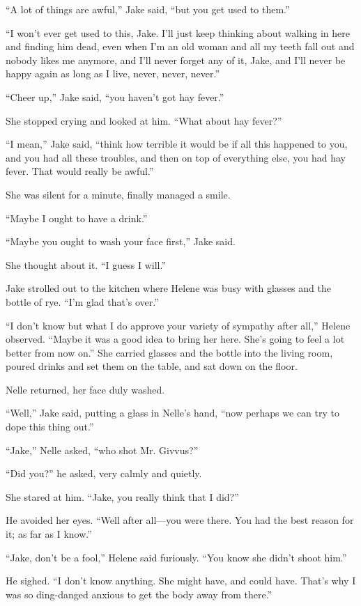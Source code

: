 \documentclass{novel}
\begin{document}
“A lot of things are awful,” Jake said, “but you get used to them.”

“I won’t ever get used to this, Jake. I’ll just keep thinking about walking in here and finding him dead, even when I'm an old woman and all my teeth fall out and nobody likes me anymore, and I’ll never forget any of it, Jake, and I'll never be happy again as long as I live, never, never, never.”

“Cheer up,” Jake said, “you haven’t got hay fever.”

She stopped crying and looked at him. “What about hay fever?”

“I mean,” Jake said, “think how terrible it would be if all this happened to you, and you had all these troubles, and then on top of everything else, you had hay fever. That would really be awful.”

She was silent for a minute, finally managed a smile.

“Maybe I ought to have a drink.”

“Maybe you ought to wash your face first,” Jake said.

She thought about it. “I guess I will.”

Jake strolled out to the kitchen where Helene was busy with glasses and the bottle of rye. “I’m glad that’s over.”

“I don’t know but what I do approve your variety of sympathy after all,” Helene observed. “Maybe it was a good idea to bring her here. She’s going to feel a lot better from now on.” She carried glasses and the bottle into the living room, poured drinks and set them on the table, and sat down on the floor.

Nelle returned, her face duly washed.

“Well,” Jake said, putting a glass in Nelle’s hand, “now perhaps we can try to dope this thing out.”

“Jake,” Nelle asked, “who shot Mr. Givvus?”

“Did you?” he asked, very calmly and quietly.

She stared at him. “Jake, you really think that I did?”

He avoided her eyes. “Well after all—you were there. You had the best reason for it; as far as I know.”

“Jake, don’t be a fool,” Helene said furiously. “You know she didn’t shoot him.”

He sighed. “I don’t know anything. She might have, and could have. That’s why I was so ding-danged anxious to get the body away from there.”
\end{document}
